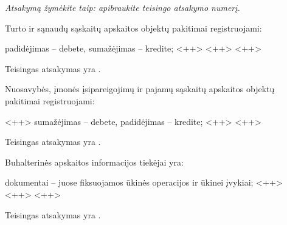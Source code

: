 \begin{tasks}

  \emph{Atsakymą žymėkite taip: apibraukite teisingo atsakymo numerį.}

  \begin{task}
    \begin{condition}
      Turto ir sąnaudų sąskaitų apskaitos objektų pakitimai registruojami:
      \begin{enumerate}
         padidėjimas – debete, sumažėjimas – kredite;
         <++>
         <++>
         <++>
      \end{enumerate}
    \end{condition}
    \begin{solution}
      Teisingas atsakymas yra .
    \end{solution}
  \end{task}

  \begin{task}
    \begin{condition}
      Nuosavybės, įmonės įsipareigojimų ir pajamų sąskaitų
      apskaitos objektų pakitimai registruojami:
      \begin{enumerate}
         <++>
         sumažėjimas – debete, padidėjimas – kredite;
         <++>
         <++>
      \end{enumerate}
    \end{condition}
    \begin{solution}
      Teisingas atsakymas yra .
    \end{solution}
  \end{task}

  \begin{task}
    \begin{condition}
      Buhalterinės apskaitos informacijos tiekėjai yra:
      \begin{enumerate}
         dokumentai – juose fiksuojamos ūkinės operacijos
          ir ūkinei įvykiai;
         <++>
         <++>
         <++>
      \end{enumerate}
    \end{condition}
    \begin{solution}
      Teisingas atsakymas yra .
    \end{solution}
  \end{task}


\end{tasks}
